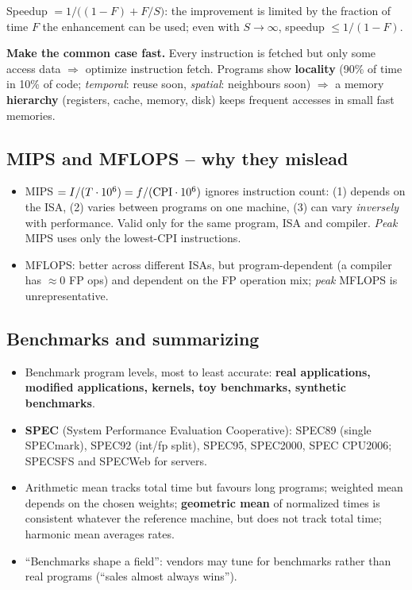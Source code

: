 \documentclass[11pt]{article}
\begin{document}
\begin{theorem}
Speedup $=1/\big((1-F)+F/S\big)$: the improvement is limited by the fraction
of time $F$ the enhancement can be used; even with $S\to\infty$, speedup
$\le 1/(1-F)$.
\end{theorem}
\begin{note}
\textbf{Make the common case fast.} Every instruction is fetched but only
some access data $\Rightarrow$ optimize instruction fetch. Programs show
\textbf{locality} (90\% of time in 10\% of code; \emph{temporal}: reuse
soon, \emph{spatial}: neighbours soon) $\Rightarrow$ a memory
\textbf{hierarchy} (registers, cache, memory, disk) keeps frequent accesses
in small fast memories.
\end{note}

\subsection{MIPS and MFLOPS -- why they mislead}
\begin{itemize}[leftmargin=*]
  \item MIPS $=I/(T\cdot10^6)=f/(\mathrm{CPI}\cdot10^6)$ ignores instruction count:
  (1) depends on the ISA, (2) varies between programs on one machine, (3) can
  vary \emph{inversely} with performance. Valid only for the same program,
  ISA and compiler. \emph{Peak} MIPS uses only the lowest-CPI instructions.
  \item MFLOPS: better across different ISAs, but program-dependent (a
  compiler has $\approx0$ FP ops) and dependent on the FP operation mix;
  \emph{peak} MFLOPS is unrepresentative.
\end{itemize}

\subsection{Benchmarks and summarizing}
\begin{itemize}[leftmargin=*]
  \item Benchmark program levels, most to least accurate: \textbf{real
  applications, modified applications, kernels, toy benchmarks, synthetic
  benchmarks}.
  \item \textbf{SPEC} (System Performance Evaluation Cooperative): SPEC89
  (single SPECmark), SPEC92 (int/fp split), SPEC95, SPEC2000, SPEC CPU2006;
  SPECSFS and SPECWeb for servers.
  \item Arithmetic mean tracks total time but favours long programs; weighted
  mean depends on the chosen weights; \textbf{geometric mean} of normalized
  times is consistent whatever the reference machine, but does not track
  total time; harmonic mean averages rates.
  \item ``Benchmarks shape a field'': vendors may tune for benchmarks rather
  than real programs (``sales almost always wins'').
\end{itemize}
\end{document}

